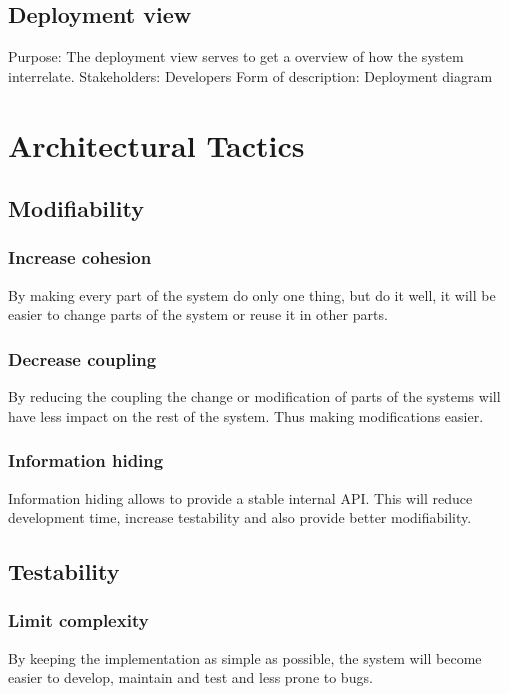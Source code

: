 \documentclass[11pt]{book}
\begin{document}
\subsection{Deployment view}\label{subsec:deploymentViewDescription}
Purpose: The deployment view serves to get a overview of how the system interrelate.
Stakeholders: Developers
Form of description: Deployment diagram

\section{Architectural Tactics}

\subsection{Modifiability}

\subsubsection{Increase cohesion}
By making every part of the system do only one thing, but do it well, it will be easier to change parts of the system or reuse it in other parts.

\subsubsection{Decrease coupling}
By reducing the coupling the change or modification of parts of the systems will have less impact on the rest of the system. Thus making modifications easier.

\subsubsection{Information hiding}
Information hiding allows to provide a stable internal API. This will reduce development time, increase testability and also provide better modifiability.

\subsection{Testability}

\subsubsection{Limit complexity}
By keeping the implementation as simple as possible, the system will become easier to develop, maintain and test and less prone to bugs.
\end{document}
